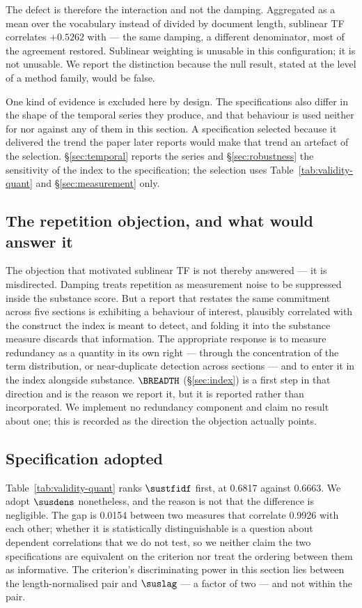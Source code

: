 The defect is therefore the interaction and not the damping. Aggregated as a mean over the
vocabulary instead of divided by document length, sublinear TF correlates $+0.5262$ with
\QUANT{} --- the same damping, a different denominator, most of the agreement restored.
Sublinear weighting is unusable in this configuration; it is not unusable. We report the
distinction because the null result, stated at the level of a method family, would be false.

One kind of evidence is excluded here by design. The specifications also differ in the shape
of the temporal series they produce, and that behaviour is used neither for nor against any
of them in this section. A specification selected because it delivered the trend the paper
later reports would make that trend an artefact of the selection.
\S\ref{sec:temporal} reports the series and \S\ref{sec:robustness} the sensitivity of the
index to the specification; the selection uses Table~\ref{tab:validity-quant} and
\S\ref{sec:measurement} only.

\subsection{The repetition objection, and what would answer it}

The objection that motivated sublinear TF is not thereby answered --- it is misdirected.
Damping treats repetition as measurement noise to be suppressed inside the substance
score. But a report that restates the same commitment across five sections is exhibiting
a behaviour of interest, plausibly correlated with the construct the index is meant to
detect, and folding it into the substance measure discards that information. The
appropriate response is to measure redundancy as a quantity in its own right --- through
the concentration of the term distribution, or near-duplicate detection across sections
--- and to enter it in the index alongside substance. $\BREADTH$ (\S\ref{sec:index}) is
a first step in that direction and is the reason we report it, but it is reported rather
than incorporated. We implement no redundancy component and claim no result about one;
this is recorded as the direction the objection actually points.

\subsection{Specification adopted}
\label{sec:validity-adopted}

Table~\ref{tab:validity-quant} ranks $\sustfidf$ first, at 0.6817 against 0.6663. We adopt
$\susdens$ nonetheless, and the reason is not that the difference is negligible. The gap is
0.0154 between two measures that correlate 0.9926 with each other; whether it is
statistically distinguishable is a question about dependent correlations that we do not
test, so we neither claim the two specifications are equivalent on the criterion nor treat
the ordering between them as informative. The criterion's discriminating power in this
section lies between the length-normalised pair and $\suslag$ --- a factor of two --- and
not within the pair.

